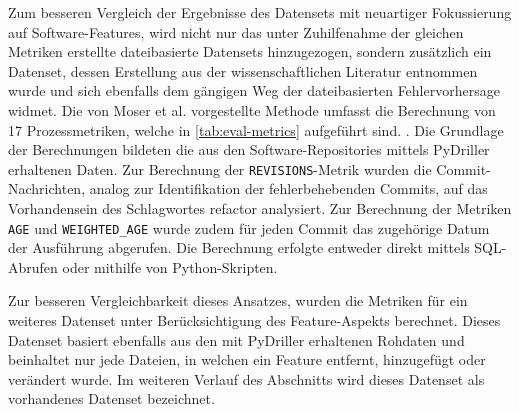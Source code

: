 Zum besseren Vergleich der Ergebnisse des Datensets mit neuartiger Fokussierung auf Software-Features, wird nicht nur das unter Zuhilfenahme der gleichen Metriken erstellte dateibasierte Datensets hinzugezogen, sondern zusätzlich ein Datenset, dessen Erstellung aus der wissenschaftlichen Literatur entnommen wurde und sich ebenfalls dem gängigen Weg der dateibasierten Fehlervorhersage widmet. Die von Moser et al. vorgestellte Methode umfasst die Berechnung von 17 Prozessmetriken, welche in \autoref{tab:eval-metrics} aufgeführt sind. \cite{Moser2008}. Die Grundlage der Berechnungen bildeten die aus den Software-Repositories mittels PyDriller erhaltenen Daten. Zur Berechnung der \texttt{REVISIONS}-Metrik wurden die Commit-Nachrichten, analog zur Identifikation der fehlerbehebenden Commits, auf das Vorhandensein des Schlagwortes \glqq refactor\grqq{} analysiert. Zur Berechnung der Metriken \texttt{AGE} und \texttt{WEIGHTED\_AGE} wurde zudem für jeden Commit das zugehörige Datum der Ausführung abgerufen. Die Berechnung erfolgte entweder direkt mittels SQL-Abrufen oder mithilfe von Python-Skripten.

Zur besseren Vergleichbarkeit dieses Ansatzes, wurden die Metriken für ein weiteres Datenset unter Berücksichtigung des Feature-Aspekts berechnet. Dieses Datenset basiert ebenfalls aus den mit PyDriller erhaltenen Rohdaten und beinhaltet nur jede Dateien, in welchen ein Feature entfernt, hinzugefügt oder verändert wurde. Im weiteren Verlauf des Abschnitts wird dieses Datenset als \glqq vorhandenes Datenset\grqq{} bezeichnet.

